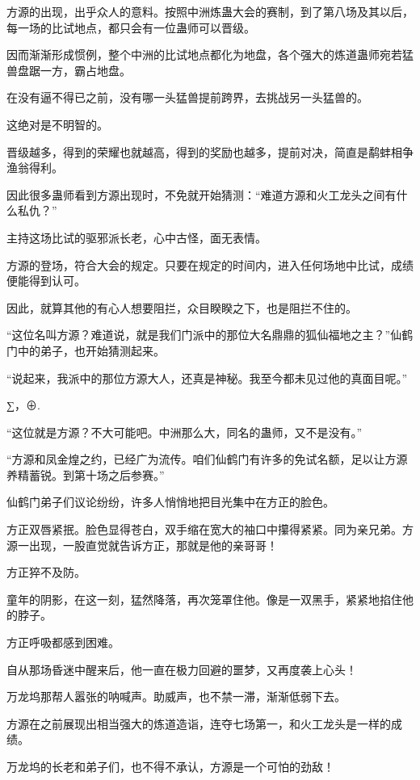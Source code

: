 
\begin{this_body}

方源的出现，出乎众人的意料。按照中洲炼蛊大会的赛制，到了第八场及其以后，每一场的比试地点，都只会有一位蛊师可以晋级。

因而渐渐形成惯例，整个中洲的比试地点都化为地盘，各个强大的炼道蛊师宛若猛兽盘踞一方，霸占地盘。

在没有逼不得已之前，没有哪一头猛兽提前跨界，去挑战另一头猛兽的。

这绝对是不明智的。

晋级越多，得到的荣耀也就越高，得到的奖励也越多，提前对决，简直是鹬蚌相争渔翁得利。

因此很多蛊师看到方源出现时，不免就开始猜测：“难道方源和火工龙头之间有什么私仇？”

主持这场比试的驱邪派长老，心中古怪，面无表情。

方源的登场，符合大会的规定。只要在规定的时间内，进入任何场地中比试，成绩便能得到认可。

因此，就算其他的有心人想要阻拦，众目睽睽之下，也是阻拦不住的。

“这位名叫方源？难道说，就是我们门派中的那位大名鼎鼎的狐仙福地之主？”仙鹤门中的弟子，也开始猜测起来。

“说起来，我派中的那位方源大人，还真是神秘。我至今都未见过他的真面目呢。”

∑，⊕.

“这位就是方源？不大可能吧。中洲那么大，同名的蛊师，又不是没有。”

“方源和凤金煌之约，已经广为流传。咱们仙鹤门有许多的免试名额，足以让方源养精蓄锐。到第十场之后参赛。”

仙鹤门弟子们议论纷纷，许多人悄悄地把目光集中在方正的脸色。

方正双唇紧抿。脸色显得苍白，双手缩在宽大的袖口中攥得紧紧。同为亲兄弟。方源一出现，一股直觉就告诉方正，那就是他的亲哥哥！

方正猝不及防。

童年的阴影，在这一刻，猛然降落，再次笼罩住他。像是一双黑手，紧紧地掐住他的脖子。

方正呼吸都感到困难。

自从那场昏迷中醒来后，他一直在极力回避的噩梦，又再度袭上心头！

万龙坞那帮人嚣张的呐喊声。助威声，也不禁一滞，渐渐低弱下去。

方源在之前展现出相当强大的炼道造诣，连夺七场第一，和火工龙头是一样的成绩。

万龙坞的长老和弟子们，也不得不承认，方源是一个可怕的劲敌！


\end{this_body}
